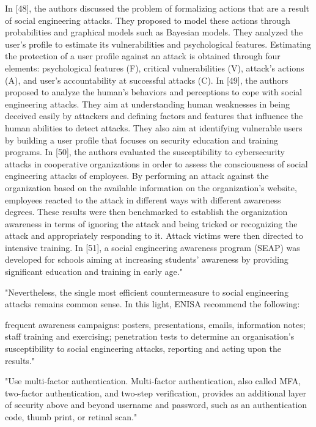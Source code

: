 In [48], the authors discussed the problem of formalizing actions that are a result of social engineering attacks. They proposed to model these actions through probabilities and graphical models such as Bayesian models. They analyzed the user’s profile to estimate its vulnerabilities and psychological features. Estimating the protection of a user profile against an attack is obtained through four elements: psychological features (F), critical vulnerabilities (V), attack’s actions (A), and user’s accountability at successful attacks (C). In [49], the authors proposed to analyze the human’s behaviors and perceptions to cope with social engineering attacks. They aim at understanding human weaknesses in being deceived easily by attackers and defining factors and features that influence the human abilities to detect attacks. They also aim at identifying vulnerable users by building a user profile that focuses on security education and training programs.
In [50], the authors evaluated the susceptibility to cybersecurity attacks in cooperative organizations in order to assess the consciousness of social engineering attacks of employees. By performing an attack against the organization based on the available information on the organization’s website, employees reacted to the attack in different ways with different awareness degrees. These results were then benchmarked to establish the organization awareness in terms of ignoring the attack and being tricked or recognizing the attack and appropriately responding to it. Attack victims were then directed to intensive training. In [51], a social engineering awareness program (SEAP) was developed for schools aiming at increasing students’ awareness by providing significant education and training in early age."\cite{4_mdpi}

"Nevertheless, the single most efficient countermeasure to social engineering attacks remains common sense. In this light, ENISA recommend the following: 

frequent awareness campaigns: posters, presentations, emails, information notes;
staff training and exercising;
penetration tests to determine an organisation's susceptibility to social engineering attacks, reporting and acting upon the results."\cite{1_enisa}


"Use multi-factor authentication. Multi-factor authentication,
also called MFA, two-factor authentication, and two-step
verification, provides an additional layer of security above and
beyond username and password, such as an authentication
code, thumb print, or retinal scan."\cite{3_barracuda}

